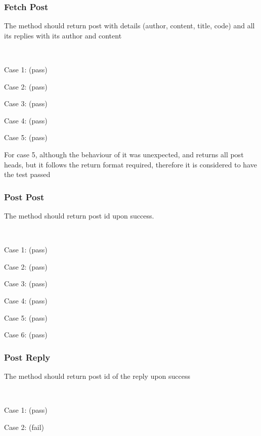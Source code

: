 \subsubsection{Fetch Post}
The method should return post with details (author, content, title, code) and all its replies with its author and content

~

Case 1: (pass)


Case 2: (pass)


Case 3: (pass)


Case 4: (pass)


Case 5: (pass)


For case 5, although the behaviour of it was unexpected, and returns all post heads, but it follows the return format required, therefore it is considered to have the test passed

\subsubsection{Post Post}
The method should return post id upon success.

~

Case 1: (pass)


Case 2: (pass)


Case 3: (pass)


Case 4: (pass)


Case 5: (pass)


Case 6: (pass)


\subsubsection{Post Reply}
The method should return post id of the reply upon success

~

Case 1: (pass)


Case 2: (fail)


